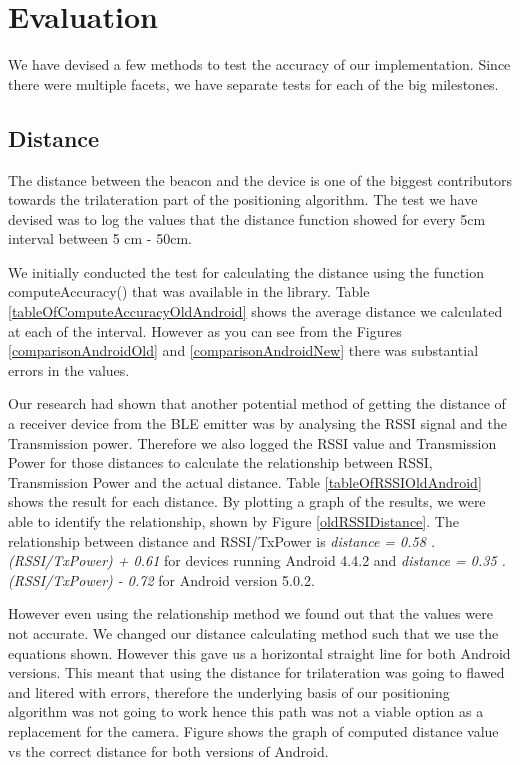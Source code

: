 \section{Evaluation} \label{nocamera-eval}
We have devised a few methods to test the accuracy of our implementation. Since there were multiple facets, we have separate tests for each of the big milestones.
\subsection{Distance}
The distance between the beacon and the device is one of the biggest contributors towards the trilateration part of the positioning algorithm. The test we have devised was to log the values that the distance function showed for every 5cm interval between 5 cm - 50cm.

We initially conducted the test for calculating the distance using the function computeAccuracy() that was available in the library. Table \ref{tableOfComputeAccuracyOldAndroid} shows the average distance we calculated at each of the interval. However as you can see from the Figures \ref{comparisonAndroidOld} and \ref{comparisonAndroidNew} there was substantial errors in the values. 

Our research had shown that another potential method of getting the distance of a receiver device from the BLE emitter was by analysing the RSSI signal and the Transmission power. Therefore we also logged the RSSI value and Transmission Power for those distances to calculate the relationship between RSSI, Transmission Power and the actual distance. Table \ref{tableOfRSSIOldAndroid} shows the result for each distance. By plotting a graph of the results, we were able to identify the relationship, shown by Figure \ref{oldRSSIDistance}. The relationship between distance and RSSI/TxPower is \emph{distance = 0.58 . (RSSI/TxPower) + 0.61} for devices running Android 4.4.2  and \emph{distance = 0.35 . (RSSI/TxPower) - 0.72} for Android version 5.0.2.

However even using the relationship method we found out that the values were not accurate. We changed our distance calculating method such that we use the equations shown. However this gave us a horizontal straight line for both Android versions. This meant that using the distance for trilateration was going to flawed and litered with errors, therefore the underlying basis of our positioning algorithm was not going to work hence this path was not a viable option as a replacement for the camera. Figure shows the graph of computed distance value vs the correct distance for both versions of Android.





